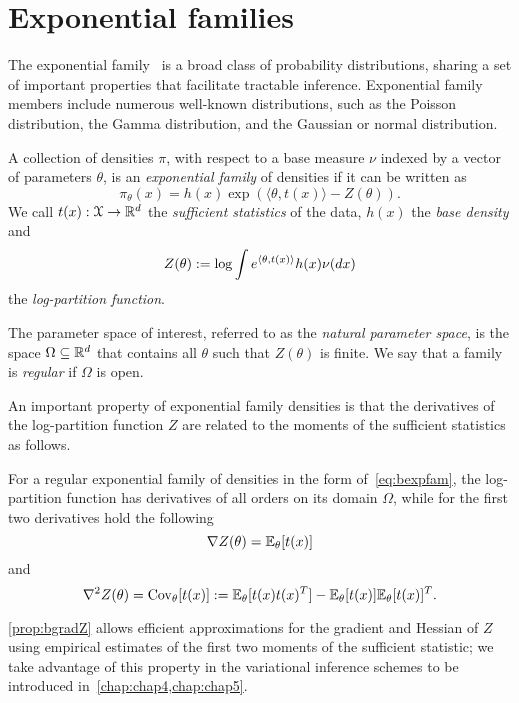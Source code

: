 \section{Exponential families}
\label{sec:b-expfam}

The exponential family~\citep{wainwright08} is a broad class of probability distributions, sharing a set of important properties that facilitate tractable inference. Exponential family members include numerous well-known distributions, such as the Poisson distribution, the Gamma distribution, and the Gaussian or normal distribution. 

\begin{ndefn} \label{def:bexpfam}
	A collection of densities $\pi$, with respect to a base measure $\nu$ indexed by a vector of parameters $\theta$, is an \emph{exponential family} of densities if it can be written as
	\[
	\pi_{\theta}(x) = h(x) \exp\left( \langle \theta, t(x) \rangle - Z(\theta) \right).
	\label{eq:bexpfam}
	\]
	We call $t(x): \mathcal{X} \rightarrow \mathbb{R}^{d}$ the \emph{sufficient statistics} of the data, $h(x)$ the \emph{base density} and 
	\[
	Z(\theta):= \log \int e^{\langle \theta, t(x) \rangle } h(x) \nu(dx)
	\label{eq:b-logpartition}
	\]
	the \emph{log-partition function}.
\end{ndefn}

The parameter space of interest, referred to as the \emph{natural parameter space}, is the space $\Omega \subseteq \mathbb{R}^d $ that contains all $\theta$ such that $Z(\theta)$ is finite. We say that a family is \emph{regular} if $\Omega$ is open.

An important property of exponential family densities is that the derivatives of the log-partition function $Z$ are related to the moments of the sufficient statistics as follows.

\begin{nprop} \label{prop:bgradZ}
	For a regular exponential family of densities in the form of~\cref{eq:bexpfam}, the log-partition function has derivatives of all orders on its domain $\Omega$, while for the first two derivatives hold the following
	\[
	\nabla Z(\theta) = \mathbb{E}_{\theta}[t(x)]
	\label{eq:bgradZ}
	\] 	
	and 
	\[
	\nabla^2Z(\theta) = \operatorname{Cov}_{\theta}[t(x)] := \mathbb{E}_{\theta}[t(x)t(x)^T] - \mathbb{E}_{\theta}[t(x)]\mathbb{E}_{\theta}[t(x)]^T.
	\label{eq:bhessZ}
	\]
\end{nprop}

\cref{prop:bgradZ} allows efficient approximations for the gradient and Hessian of $ Z $ using empirical estimates of the first two moments of the sufficient statistic; we take advantage of this property in the variational inference schemes to be introduced in~\cref{chap:chap4,chap:chap5}.

